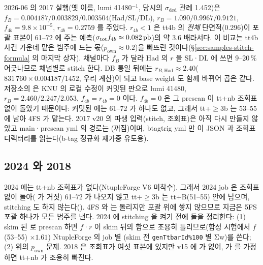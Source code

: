 2026-06 의 2017 실행(옛 이름, lumi 41480\pb$^{-1}$, 당시의 $\sigma_{\mathrm{ded}}$ 관례 1.452\pb)은 $f_{B}=0.004187/0.003829/0.003504$(Had/SL/DL),
$r_{B}=1.090/0.9967/0.9121$, $f_{4b}=9.8\times10^{-5}$, $r_{4b}=0.2759$ 를 주었다. $r_{4b}<1$ 은 tt4b 의 \emph{전체}
단면적(0.296\pb)이 포괄 표본이 61--72 에 주는 예측($\sigma_{\mathrm{tot}}f_{4b}\approx0.082\,\mathrm{pb}$)의 약 3.6 배라서다. 이 비교는 tt4b 사건 가운데 맡은 범주에 드는
몫($p_{\mathrm{own}}\approx0.2$)을 빠뜨린 것이다(\S\ref{sec:samples-stitch-formula} 의 마지막 상자). 채널마다 $f_B$ 가 달라 Had 의 $r$ 을 SL·DL 에 쓰면 9--20\,\% 어긋나므로 채널별로
stitch 한다. DB 통일 뒤에는 $r_{B,\mathrm{Had}}\approx2.40$($831\,760\times0.004187/1452$, 우리 계산)이 되고 base weight 도 함께 바뀌어 곱은
같다. 저장소의  은 KNU 의 로컬 수정이 커밋된 판으로 lumi 41480,
$r_B=2.460/2.247/2.053$, $f_{4b}=r_{4b}=0$ 이다. $f_{4b}=0$ 은 그 prescan 이 tt+nb 조회표 없이 돌았기 때문이다: 커밋된  에는
61--72 가 하나도 없고, 그래서 tt+$\geq$3b 는 53--55 에 남아 4FS 가 맡는다. 2017 v20 의 파생 입력(stitch, 조회표)은 아직 다시 만들지 않았고
main·prescan yml 의 경로는 (꺼짐)이며, btagtrig yml 만 이 JSON 과 조회표 디렉터리를 읽는다(b-tag 정규화 재가중 유도용).

\subsection{2024 와 2018}\label{sec:samples-stitch-2024}

2024 에는 tt+nb 조회표가 없다(NtupleForge V6 미착수). 그래서 2024 job 은 조회표 없이 돌아( 가 거짓) 61--72 가 나오지 않고
tt+$\geq$3b 는 tt+B(51--55) 안에 남으며, stitching 도 하지 않는다(). 4FS  와  는 돌리지만 포괄 \ttbar 위에 쌓지
않으므로 지금은 5FS 포괄 하나가 모든 범주를 낸다. 2024 에 stitching 을 켜기 전에 둘을 정리한다: (1) skim 된  로
prescan 하면 $f$·$r$ 이 skim 뒤의 합으로 조용히 틀리므로(합성 시험에서 $f$(53--55) $\times1.61$) NtupleForge 의 job 별 (skim 전
\texttt{genTtbarId\%100} 별 Σw)를 쓴다; (2) 위의 $p_{\mathrm{own}}$ 문제. 2018 은 조회표가 여섯 표본에 있지만 v15 에  가 없어, 
가  를 가정하면 tt+nb 가 조용히 빠진다.

